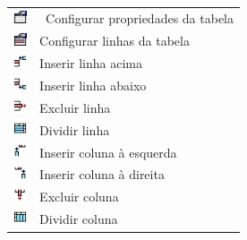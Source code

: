 \begin{table}
\begin{center}
 \begin{tabular}{m{0.5cm} m{6.0cm}} \\
  \includegraphics[width=0.4cm]{imagem/cap0/table-prop.jpg} & \ Configurar propriedades da tabela \\
  \includegraphics[width=0.4cm]{imagem/cap0/row-prop.jpg} & Configurar linhas da tabela \\
  \includegraphics[width=0.4cm]{imagem/cap0/row-insert-above.jpg} & Inserir linha acima \\
  \includegraphics[width=0.4cm]{imagem/cap0/row-insert-under.jpg} & Inserir linha abaixo \\
  \includegraphics[width=0.4cm]{imagem/cap0/row-delete.jpg} & Excluir linha \\
  \includegraphics[width=0.4cm]{imagem/cap0/row-split.jpg} & Dividir linha \\
  \includegraphics[width=0.4cm]{imagem/cap0/col-insert-before.jpg} & Inserir coluna à esquerda \\
  \includegraphics[width=0.4cm]{imagem/cap0/col-insert-after.jpg} & Inserir coluna à direita \\
  \includegraphics[width=0.4cm]{imagem/cap0/col-delete.jpg} & Excluir coluna \\
  \includegraphics[width=0.4cm]{imagem/cap0/col-split.jpg} & Dividir coluna \\

\end{tabular}
\end{center}
\end{table}
